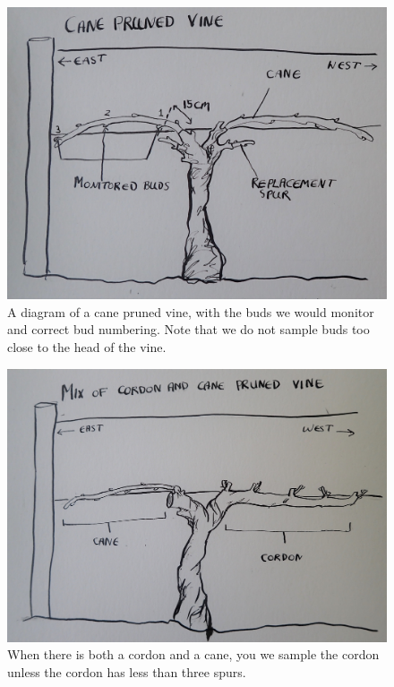 \documentclass[11pt,letter]{article}
\begin{document}
\begin{figure}
  \includegraphics[width=\linewidth]{CanePruned.jpg}
  \caption{A diagram of a cane pruned vine, with the buds we would monitor and correct bud numbering. Note that we do not sample buds too close to the head of the vine.}
  \label{fig:CanePruned}
\end{figure}

\begin{figure}
  \includegraphics[width=\linewidth]{CaneCordonMix.jpg}
  \caption{When there is both a cordon and a cane, you we sample the cordon unless the cordon has less than three spurs.}
  \label{fig:CordonCane}
\end{figure}
\end{document}

